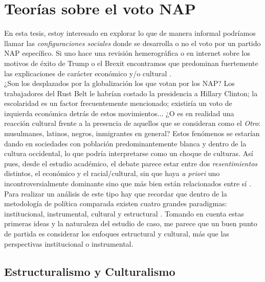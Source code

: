 \chapter{Teorías sobre el voto NAP}

En esta tesis, estoy interesado en explorar lo que de manera informal podríamos llamar las \textit{configuraciones sociales} donde se desarrolla o no el voto por un partido NAP específico. Si uno hace una revisión hemerográfica o en internet sobre los motivos de éxito de Trump o el Brexit encontramos que predominan fuertemente las explicaciones de carácter económico y/o cultural \parencites{Beauchamp16a}{Beauchamp16b}{Carney16}{Tesler16}{Sides16} {Arnade16}.\\ 

¿Son los desplazados por la globalización los que votan por los NAP? Los trabajadores del Rust Belt le habrían costado la presidencia a Hillary Clinton; la escolaridad es un factor frecuentemente mencionado; existiría un voto de izquierda económica detrás de estos movimientos... ¿O es en realidad una reacción cultural frente a la presencia de aquellos que se consideran como el \textit{Otro}: musulmanes, latinos, negros, inmigrantes en general? Estos fenómenos se estarían dando en sociedades con población predominantemente blanca y dentro de la cultura occidental, lo que podría interpretarse como un choque de culturas. Así pues, desde el estudio académico, el debate parece estar entre dos \textit{resentimientos} distintos, el económico y el racial/cultural, sin que haya \textit{a priori} uno incontroversialmente dominante sino que más bien están relacionados entre sí \parencites{Inglehart16}{Ivarsflaten14}.\\ 

Para realizar un análisis de este tipo hay que recordar que dentro de la metodología de política comparada existen cuatro grandes paradigmas: institucional, instrumental, cultural y estructural \parencite{Uribe16}. Tomando en cuenta estas primeras ideas y la naturaleza del estudio de caso, me parece que un buen punto de partida es considerar los enfoques estructural y cultural, más que las perspectivas institucional o instrumental.  

\section{Estructuralismo y Culturalismo} 

